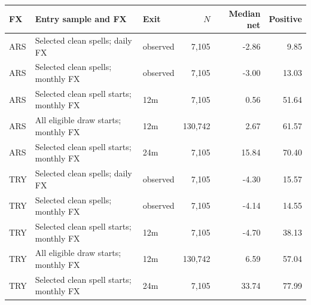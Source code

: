 \begin{tabular}{lllrrr}
\toprule
FX & Entry sample and FX & Exit & $N$ & Median net & Positive \\
\midrule
ARS & Selected clean spells; daily FX & observed & 7,105 & -2.86 & 9.85 \\
ARS & Selected clean spells; monthly FX & observed & 7,105 & -3.00 & 13.03 \\
ARS & Selected clean spell starts; monthly FX & 12m & 7,105 & 0.56 & 51.64 \\
ARS & All eligible draw starts; monthly FX & 12m & 130,742 & 2.67 & 61.57 \\
ARS & Selected clean spell starts; monthly FX & 24m & 7,105 & 15.84 & 70.40 \\
TRY & Selected clean spells; daily FX & observed & 7,105 & -4.30 & 15.57 \\
TRY & Selected clean spells; monthly FX & observed & 7,105 & -4.14 & 14.55 \\
TRY & Selected clean spell starts; monthly FX & 12m & 7,105 & -4.70 & 38.13 \\
TRY & All eligible draw starts; monthly FX & 12m & 130,742 & 6.59 & 57.04 \\
TRY & Selected clean spell starts; monthly FX & 24m & 7,105 & 33.74 & 77.99 \\
\bottomrule
\end{tabular}
